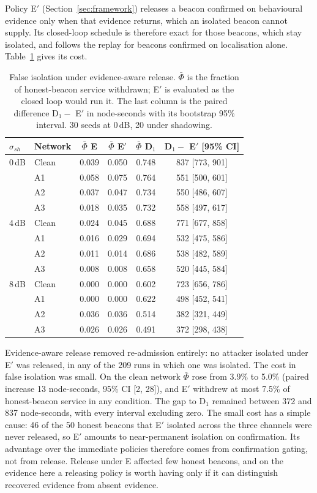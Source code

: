 Policy E$'$ (Section~\ref{sec:framework}) releases a beacon confirmed on
behavioural evidence only when that evidence returns, which an isolated
beacon cannot supply. Its closed-loop schedule is therefore exact for those
beacons, which stay isolated, and follows the replay for beacons confirmed on
localisation alone. Table~\ref{tab:release} gives its cost.

\begin{table}[!t]
\caption{False isolation under evidence-aware release. $\bar\Phi$ is the
fraction of honest-beacon service withdrawn; E$'$ is evaluated as the closed
loop would run it. The last column is the paired difference D$_1 -$ E$'$ in
node-seconds with its bootstrap 95\% interval. 30 seeds at 0\,dB, 20 under
shadowing.}
\label{tab:release}
\centering
\small
\setlength{\tabcolsep}{4pt}
\begin{tabular}{@{}llcccc@{}}
\toprule
$\sigma_{sh}$ & Network & $\bar\Phi$ E & $\bar\Phi$ E$'$ & $\bar\Phi$ D$_1$ & D$_1 -$ E$'$ [95\% CI] \\
\midrule
0\,dB & Clean & 0.039 & 0.050 & 0.748 & 837 [773, 901] \\
      & A1    & 0.058 & 0.075 & 0.764 & 551 [500, 601] \\
      & A2    & 0.037 & 0.047 & 0.734 & 550 [486, 607] \\
      & A3    & 0.018 & 0.035 & 0.732 & 558 [497, 617] \\
4\,dB & Clean & 0.024 & 0.045 & 0.688 & 771 [677, 858] \\
      & A1    & 0.016 & 0.029 & 0.694 & 532 [475, 586] \\
      & A2    & 0.011 & 0.014 & 0.686 & 538 [482, 589] \\
      & A3    & 0.008 & 0.008 & 0.658 & 520 [445, 584] \\
8\,dB & Clean & 0.000 & 0.000 & 0.602 & 723 [656, 786] \\
      & A1    & 0.000 & 0.000 & 0.622 & 498 [452, 541] \\
      & A2    & 0.036 & 0.036 & 0.514 & 382 [321, 449] \\
      & A3    & 0.026 & 0.026 & 0.491 & 372 [298, 438] \\
\bottomrule
\end{tabular}
\end{table}

Evidence-aware release removed re-admission entirely: no attacker isolated
under E$'$ was released, in any of the 209 runs in which one was isolated. The
cost in false isolation was small. On the clean network $\bar\Phi$ rose from
3.9\% to 5.0\% (paired increase 13 node-seconds, 95\% CI [2, 28]), and E$'$
withdrew at most 7.5\% of honest-beacon service in any condition. The gap to
D$_1$ remained between 372 and 837 node-seconds, with every interval
excluding zero. The small cost has a simple cause: 46 of the 50 honest
beacons that E$'$ isolated across the three channels were never released, so
E$'$ amounts to near-permanent isolation on confirmation. Its advantage over
the immediate policies therefore comes from confirmation gating, not from
release. Release under E affected few honest beacons, and on the evidence
here a releasing policy is worth having only if it can distinguish recovered
evidence from absent evidence.

